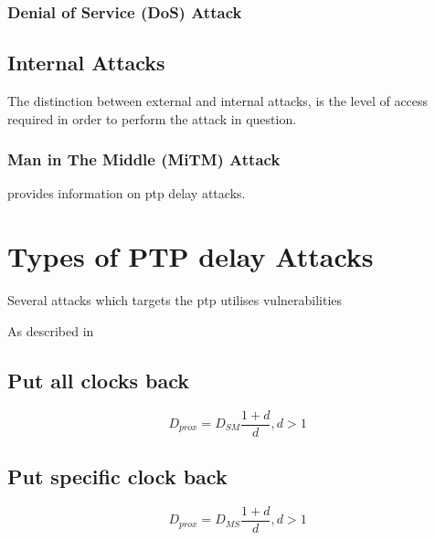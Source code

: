 \subsubsection{Denial of Service (DoS) Attack}


\subsection{Internal Attacks}
The distinction between external and internal attacks, is the level of access required in order to perform the attack in question.

\subsubsection{Man in The Middle (MiTM) Attack}



\cite{itkin2017security} provides information on \acrshort{ptp} delay attacks.





\section{Types of PTP delay Attacks}
Several attacks which targets the \acrlong{ptp}  utilises vulnerabilities 



As described in \cite{ullmann2009delay}
\subsection{Put all clocks back}

\begin{equation} \label{DSM}
    D_{prox}=D_{SM}\frac{1+d}{d},d>1 
\end{equation}
\subsection{Put specific clock back}
\begin{equation} \label{DMS}
    D_{prox}=D_{MS}\frac{1+d}{d},d>1 
\end{equation}

